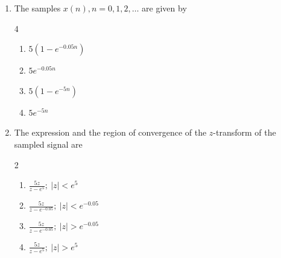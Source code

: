 \begin{enumerate}[label=\thesubsection.\arabic*,ref=\thesubsection.\theenumi]
\begin{enumerate}
\item The samples $x(n), n=0,1,2,\ldots$ are given by
\begin{multicols}{4}
\begin{enumerate}
  \item $5 \left( 1 - e^{-0.05 n} \right)$
  \item $5 e^{-0.05 n}$
  \item $5 \left( 1 - e^{-5 n} \right)$
  \item $5 e^{-5 n}$
\end{enumerate}
\end{multicols}
\item The expression and the region of convergence of the $z$-transform of the sampled signal are
\begin{multicols}{2}
\begin{enumerate}
  \item $\frac{5z}{z-e^{5}};~ |z|<e^{5}$
  \item $\frac{5z}{z-e^{-0.05}};~ |z|<e^{-0.05}$
  \item $\frac{5z}{z-e^{-0.05}};~ |z|>e^{-0.05}$
  \item $\frac{5z}{z-e^{5}};~ |z|>e^{5}$
\end{enumerate}
\end{multicols}


\end{enumerate}
\end{enumerate}
